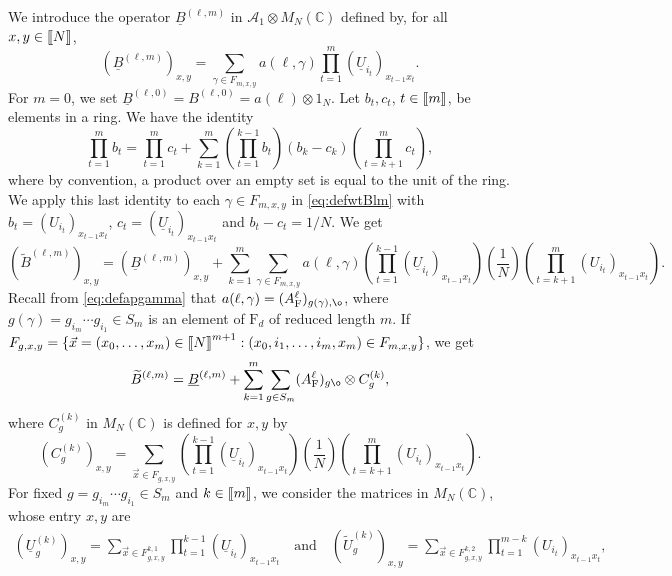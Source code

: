 \documentclass[11pt]{article}
\renewcommand{\star}{{\mathrm{F}}}
\newcommand{\cA}{\mathcal{A}}
\newcommand{\dF}{\mathrm{F}}
\newcommand{\dC}{\mathbb {C}}
\newcommand{\PAR}[1]{{{\left(#1\right)}}} %
\newcommand{\AND}{\quad \mathrm{and} \quad}
\newcommand{\1}{1\!\!{\sf I}}
\newcommand{\INT}[1]{{{\left[\hspace{-1.4pt}\left[#1\right]\hspace{-1.4pt}\right]}}}
\begin{document}
We introduce the operator $\underline B^{(\ell,m)}$ in $\cA_1 \otimes M_N(\dC)$ defined by, for all $x,y \in \INT{N}$,
\begin{equation}\label{eq:defdefub}
(\underline B^{(\ell,m)})_{x,y} = \sum_{\gamma \in F_{m,x,y}}  a(\ell,\gamma)  \prod_{t =1}^m ( \underline U_{i_t} )_{x_{t-1} x_{t} }.
\end{equation}
For $m=0$, we set $\underline B^{(\ell,0)} =  B^{(\ell,0)} = a(\ell) \otimes 1_N$.
Let $b_t,c_t$, $t \in \INT{m}$, be elements in a ring. We have the identity
$$
\prod_{t=1}^m b_t = \prod_{t=1}^m c_t + \sum_{k=1}^{m}\PAR{ \prod_{t=1}^{k-1} b_t } ( b_k - c_k) \PAR{\prod_{t = k+1}^{m} c_t},
$$
where by convention, a product over an empty set is equal to the unit of the ring. We apply this last identity to each $\gamma \in F_{m,x,y}$ in \eqref{eq:defwtBlm} with $b_t = (U_{i_t})_{x_{t-1} x_t}$, $c_t = (\underline U_{i_t})_{x_{t-1} x_t}$ and $b_t - c_t = 1/N$. We get 
\begin{equation*}
(\widetilde B^{(\ell,m)})_{x,y} = ( \underline B^{(\ell,m)})_{x,y} + \sum_{k=1}^m \sum_{\gamma \in F_{m,x,y}}  a(\ell,\gamma) \PAR{ \prod_{t=1}^{k-1} ( \underline U_{i_t} )_{x_{t-1} x_{t} } } \PAR{\frac 1 N } \PAR{\prod_{t = k+1}^{m} ( U_{i_t} )_{x_{t-1} x_{t} }}.
\end{equation*}
Recall from \eqref{eq:defapgamma} that $a(\ell,\gamma) =  (A_\star^\ell)_{g(\gamma) , \o}$, where $g(\gamma) = g_{i_m} \cdots g_{i_1} \in S_m$ is an element of $\dF_d$ of reduced length $m$. If $F_{g,x,y} = \{ \vec x = (x_0,\ldots, x_m) \in \INT{N}^{m+1} : (x_0,i_1,\ldots,i_{m},x_{m}) \in F_{m,x,y}\}$, we get 
\begin{equation}\label{eq:decomp1}
\widetilde B^{(\ell,m)} =  \underline B^{(\ell,m)} + \sum_{k=1}^m \sum_{g \in S_m} (A_\star^\ell)_{g\o} \otimes C^{(k)}_g,
\end{equation}
where  $C^{(k)}_g$ in $M_N(\dC)$ is defined for $x,y$ by 
$$
(C^{(k)}_g)_{x,y} =  \sum_{\vec x \in F_{g,x,y}} \PAR{ \prod_{t=1}^{k-1} ( \underline U_{i_t} )_{x_{t-1} x_{t} } } \PAR{\frac 1 N } \PAR{\prod_{t = k+1}^{m} ( U_{i_t} )_{x_{t-1} x_{t} }}.
$$
 For fixed $g = g_{i_m} \cdots g_{i_1} \in S_m$ and $k \in \INT{m}$, we consider the matrices in $M_N(\dC)$, whose entry $x,y$ are
\begin{align*}
(\underline U_{g}^{(k)} )_{x,y}= \sum_{\vec x  \in F^{k,1}_{g,x,y}}\prod_{t=1}^{k-1} ( \underline U_{i_t} )_{x_{t-1} x_{t} }  \AND (\widetilde U_{g}^{(k)} )_{x,y}= \sum_{\vec x \in {F}^{k,2}_{g,x,y}}\prod_{t=1}^{m-k} (  U_{i_t} )_{x_{t-1} x_{t} }, 
\end{align*}
\end{document}
